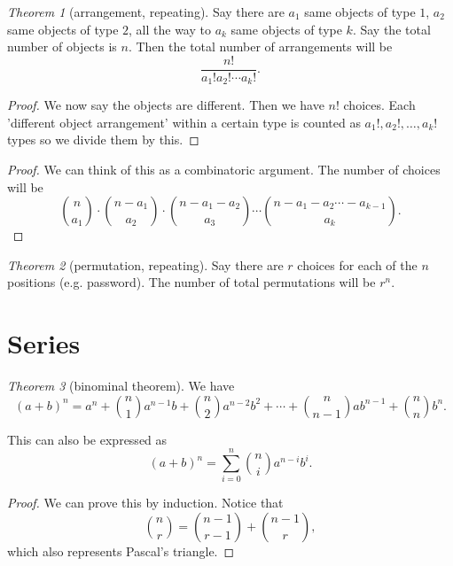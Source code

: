 \documentclass[8pt]{article}
\theoremstyle{remark}
\newtheorem{theorem}{Theorem}[section]
\begin{document}
        \begin{theorem}[arrangement, repeating]
            Say there are $a_1$ same objects of type $1$, $a_2$ same objects of type $2$, all the way to $a_k$ same objects of type $k$. Say the total number of objects is $n$. Then the total number of arrangements will be
            $$
                \frac{n!}{a_1! a_2! \cdots a_k!}.
            $$
            \begin{proof}
                We now say the objects are different. Then we have $n!$ choices. Each 'different object arrangement' within a certain type is counted as $a_1!, a_2!, \ldots, a_k!$ types so we divide them by this.
            \end{proof}
            \begin{proof}
                We can think of this as a combinatoric argument. The number of choices will be
                $$
                    \binom{n}{a_1} \cdot \binom{n - a_1}{a_2} \cdot \binom{n - a_1 - a_2}{a_3} \cdots \binom{n - a_1 - a_2 \cdots - a_{k - 1}}{a_k}.
                $$
            \end{proof}
        \end{theorem}

        \begin{theorem}[permutation, repeating]
            Say there are $r$ choices for each of the $n$ positions (e.g. password). The number of total permutations will be $r^n$.
        \end{theorem}

    \section{Series}

        \begin{theorem}[binominal theorem]
            We have
            $$
                (a + b)^n = a^n + \binom{n}{1} a^{n - 1}b + \binom{n}{2} a^{n - 2}b^2 + \cdots + \binom{n}{n - 1} a b^{n - 1} + \binom{n}{n} b^n.
            $$
            
            This can also be expressed as
            $$
                (a + b)^n = \sum_{i = 0}^{n} \binom{n}{i} a^{n - i} b^i.
            $$

            \begin{proof}
                We can prove this by induction. Notice that
                $$
                    \binom{n}{r} = \binom{n - 1}{r - 1} + \binom{n - 1}{r},
                $$
                which also represents Pascal's triangle.
            \end{proof}
        \end{theorem}
\end{document}
